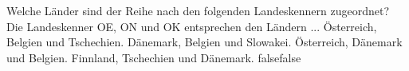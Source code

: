     {Welche Länder sind der Reihe nach den folgenden Landeskennern zugeordnet? Die Landeskenner OE, ON und OK entsprechen den Ländern ...}
    {Österreich, Belgien und Tschechien.}
    {Dänemark, Belgien und Slowakei.}
    {Österreich, Dänemark und Belgien.}
    {Finnland, Tschechien und Dänemark.}
    {false}{false}